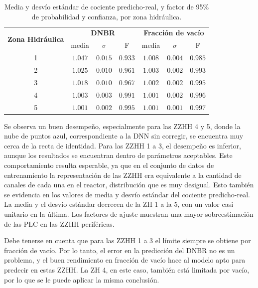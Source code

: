 \begin{table}[H]
	\centering
	\caption{Media y desvío estándar de cociente predicho-real, y factor de 95\% de probabilidad y confianza, por zona hidráulica.}
	\begin{tabular}{c c c c c c c } 
        \toprule
        \multirow{2}{*}{\textbf{Zona Hidráulica}} & \multicolumn{3}{c}{\textbf{DNBR}} & \multicolumn{3}{c}{\textbf{Fracción de vacío}} \\
            & media & $\sigma$  & F     & media & $\sigma$  & F     \\ \hline
        1 & $1.047$ & $0.015$ & $0.933$ & $1.008$ & $0.004$ & $0.985$ \\
        2 & $1.025$ & $0.010$ & $0.961$ & $1.003$ & $0.002$ & $0.993$ \\
        3 & $1.018$ & $0.010$ & $0.967$ & $1.002$ & $0.002$ & $0.995$ \\
        4 & $1.003$ & $0.003$ & $0.991$ & $1.001$ & $0.002$ & $0.996$ \\
        5 & $1.001$ & $0.002$ & $0.995$ & $1.001$ & $0.001$ & $0.997$ \\
		\bottomrule
	\end{tabular}
	\label{tab:plc_f}
\end{table}

Se observa un buen desempeño, especialmente para las ZZHH 4 y 5, donde la nube de puntos azul, correspondiente a la DNN sin corregir, se encuentra muy cerca de la recta de identidad. Para las ZZHH 1 a 3, el desempeño es inferior, aunque los resultados se encuentran dentro de parámetros aceptables. Este comportamiento resulta esperable, ya que en el conjunto de datos de entrenamiento la representación de las ZZHH era equivalente a la cantidad de canales de cada una en el reactor, distribución que es muy desigual. Esto también se evidencia en los valores de media y desvío estándar del cociente predicho-real. La media y el desvío estándar decrecen de la ZH 1 a la 5, con un valor casi unitario en la última. Los factores de ajuste muestran una mayor sobreestimación de las PLC en las ZZHH periféricas.

Debe tenerse en cuenta que para las ZZHH 1 a 3 el límite siempre se obtiene por fracción de vacío. Por lo tanto, el error en la predicción del DNBR no es un problema, y el buen rendimiento en fracción de vacío hace al modelo apto para predecir en estas ZZHH. La ZH 4, en este caso, también está limitada por vacío, por lo que se le puede aplicar la misma conclusión.

